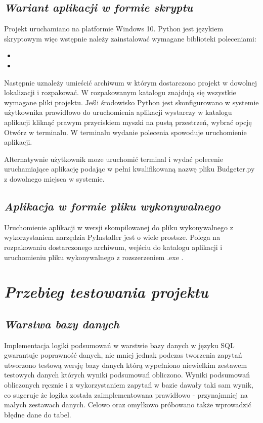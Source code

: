\documentclass[a4paper,10pt, twoside]{report}
\newcommand{\customstylechapter}[1]{\large{\textit{#1}}}
\newcommand{\customstylesection}[1]{\textbf{\textit{#1}}}
\begin{document}
\section{\customstylesection{Wariant aplikacji w formie skryptu}}
{Projekt uruchamiano na platformie Windows 10. Python jest językiem skryptowym 
więc wstępnie należy zainstalować wymagane biblioteki poleceniami:}
\begin{itemize}
    \item {}
    \item {}
\end{itemize}
{Następnie uznależy umieścić archiwum w którym dostarczono projekt w dowolnej 
lokalizacji i rozpakować. W rozpakowanym katalogu znajdują się wszystkie 
wymagane pliki projektu. Jeśli środowisko Python jest skonfigurowano w systemie 
użytkownika prawidłowo do uruchomienia aplikacji wystarczy w katalogu 
aplikacji kliknąć prawym przyciskiem myszki na pustą przestrzeń, wybrać opcję 
Otwórz w terminalu. W terminalu wydanie polecenia 
 spowoduje uruchomienie aplikacji.}

{Alternatywnie użytkownik moze uruchomić terminal i wydać polecenie 
uruchamiające aplikację podając w pełni kwalifikowaną nazwę pliku Budgeter.py z 
dowolnego miejsca w systemie.}

\section{\customstylesection{Aplikacja w formie pliku wykonywalnego}}
{Uruchomienie aplikacji w wersji skompilowanej do pliku wykonywalnego z 
wykorzystaniem narzędzia PyInstaller \cite[text]{PyInstaller} jest o wiele 
prostsze. Polega na rozpakowaniu dostarczonego archiwum, wejściu do katalogu 
aplikacji i uruchomieniu pliku wykonywalnego z rozszerzeniem .exe .}

\chapter{\customstylechapter{Przebieg testowania projektu}}
\section{\customstylesection{Warstwa bazy danych}}
{Implementacja logiki podsumowań w warstwie bazy danych w języku SQL gwarantuje 
poprawność danych, nie mniej jednak podczas tworzenia zapytań utworzono testową 
wersję bazy danych którą wypełniono niewielkim zestawem testowych danych których
 wyniki podsumowań obliczono. Wyniki podsumowań obliczonych ręcznie i z 
wykorzystaniem zapytań w bazie dawały taki sam wynik, co sugeruje że logika 
została zaimplementowana prawidłowo - przynajmniej na małych zestawach danych. 
Celowo oraz omyłkowo próbowano także wprowadzić błędne dane do tabel.}
\end{document}
